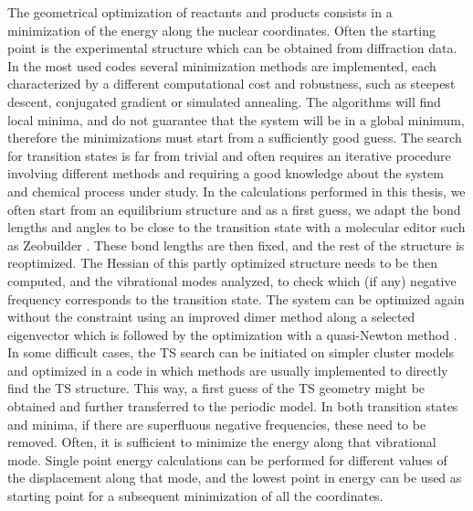 The geometrical optimization of reactants and products consists in a minimization of the energy along the nuclear coordinates. Often the starting point is the experimental structure which can be obtained from diffraction data. In the most used codes several minimization methods are implemented, each characterized by a different computational cost and robustness, such as steepest descent, conjugated gradient or simulated annealing. The algorithms will find local minima, and do not guarantee that the system will be in a global minimum, therefore the minimizations must start from a sufficiently good guess. 
The search for transition states is far from trivial and often requires an iterative procedure involving different methods and requiring a good knowledge about the system and chemical process under study. In the calculations performed in this thesis, we often start from an equilibrium structure and as a first guess, we adapt the bond lengths and angles to be close to the transition state with a molecular editor such as Zeobuilder \cite{Verstraelen2008}. These bond lengths are then fixed, and the rest of the structure is reoptimized. The Hessian of this partly optimized structure needs to be then computed, and the vibrational modes analyzed, to check which (if any) negative frequency corresponds to the transition state. The system can be optimized again without the constraint using an improved dimer method along a selected eigenvector \cite{Heyden2005} which is followed by the optimization with a quasi-Newton method \cite{Press1989}. In some difficult cases, the TS search can be initiated on simpler cluster models and optimized in a code in which methods are usually implemented to directly find the TS structure. This way, a first guess of the TS geometry might be obtained and further transferred to the periodic model. In both transition states and minima, if there are superfluous negative frequencies, these need to be removed. Often, it is sufficient to minimize the energy along that vibrational mode. Single point energy calculations can be performed for different values of the displacement along that mode, and the lowest point in energy can be used as starting point for a subsequent minimization of all the coordinates.

